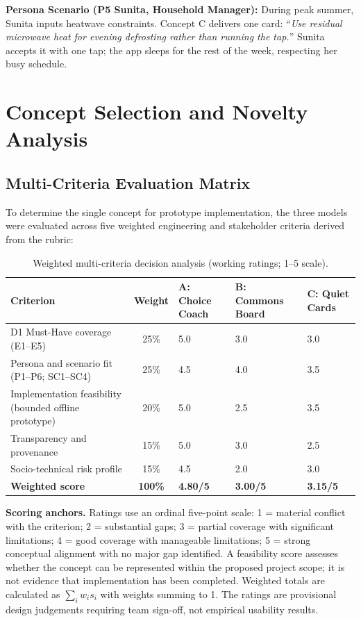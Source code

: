 \documentclass[12pt,a4paper]{article}
\begin{document}
\textbf{Persona Scenario (P5 Sunita, Household Manager):} During peak summer, Sunita inputs heatwave constraints. Concept C delivers one card: ``\emph{Use residual microwave heat for evening defrosting rather than running the tap.}'' Sunita accepts it with one tap; the app sleeps for the rest of the week, respecting her busy schedule.

\section{Concept Selection and Novelty Analysis}

\subsection{Multi-Criteria Evaluation Matrix}
To determine the single concept for prototype implementation, the three models were evaluated across five weighted engineering and stakeholder criteria derived from the rubric:

\begin{table}[ht]
\centering
\small
\caption{Weighted multi-criteria decision analysis (working ratings; 1--5 scale).}
\label{tab:mcdm}
\begin{tabularx}{\textwidth}{@{}p{3.0cm}cXXX@{}}
\toprule
\textbf{Criterion} & \textbf{Weight} & \textbf{A: Choice Coach} & \textbf{B: Commons Board} & \textbf{C: Quiet Cards}\\
\midrule
D1 Must-Have coverage (E1--E5) & 25\% & 5.0 & 3.0 & 3.0\\
Persona and scenario fit (P1--P6; SC1--SC4) & 25\% & 4.5 & 4.0 & 3.5\\
Implementation feasibility (bounded offline prototype) & 20\% & 5.0 & 2.5 & 3.5\\
Transparency and provenance & 15\% & 5.0 & 3.0 & 2.5\\
Socio-technical risk profile & 15\% & 4.5 & 2.0 & 3.0\\
\midrule
\textbf{Weighted score} & \textbf{100\%} & \textbf{4.80/5} & \textbf{3.00/5} & \textbf{3.15/5}\\
\bottomrule
\end{tabularx}
\end{table}

\textbf{Scoring anchors.} Ratings use an ordinal five-point scale: 1 = material conflict with the criterion; 2 = substantial gaps; 3 = partial coverage with significant limitations; 4 = good coverage with manageable limitations; 5 = strong conceptual alignment with no major gap identified. A feasibility score assesses whether the concept can be represented within the proposed project scope; it is not evidence that implementation has been completed. Weighted totals are calculated as $\sum_i w_i s_i$ with weights summing to 1. The ratings are provisional design judgements requiring team sign-off, not empirical usability results.
\end{document}
